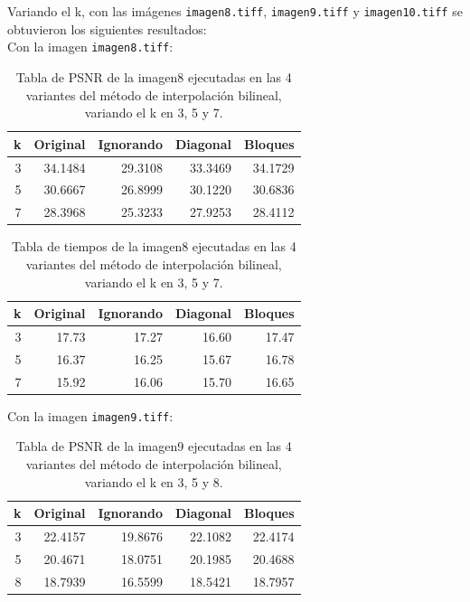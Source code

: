 \documentclass[a4paper]{article}
\newcounter{col}
\begin{document}
Variando el k, con las im\'agenes \texttt{imagen8.tiff}, \texttt{imagen9.tiff} y \texttt{imagen10.tiff} se obtuvieron los siguientes resultados:\\
Con la imagen \texttt{imagen8.tiff}:\\
\begin{table}[H]
\centering
\begin{tabular}{|r|r|r|r|r|}
\hline
\multicolumn{1}{|c|}{k} & \multicolumn{1}{c|}{Original} & \multicolumn{1}{c|}{Ignorando} & \multicolumn{1}{c|}{Diagonal} & \multicolumn{1}{c|}{Bloques} \\ \hline
3 & 34.1484 & 29.3108 & 33.3469 & 34.1729 \\ \hline
5 & 30.6667 &  26.8999 & 30.1220 & 30.6836 \\ \hline
7 & 28.3968 &  25.3233 & 27.9253 &  28.4112 \\ \hline
\end{tabular}
\caption{Tabla de PSNR de la imagen8 ejecutadas en las 4 variantes del m\'etodo de interpolaci\'on bilineal, variando el k en 3, 5 y 7.}
\label{}
\end{table}
\begin{table}[H]
\centering
\begin{tabular}{|r|r|r|r|r|}
\hline
\multicolumn{1}{|c|}{k} & \multicolumn{1}{c|}{Original} & \multicolumn{1}{c|}{Ignorando} & \multicolumn{1}{c|}{Diagonal} & \multicolumn{1}{c|}{Bloques} \\ \hline
3 & 17.73 & 17.27 & 16.60 & 17.47 \\ \hline
5 & 16.37 &  16.25 & 15.67 & 16.78 \\ \hline
7 & 15.92 &  16.06 & 15.70 &  16.65 \\ \hline
\end{tabular}
\caption{Tabla de tiempos de la imagen8 ejecutadas en las 4 variantes del m\'etodo de interpolaci\'on bilineal, variando el k en 3, 5 y 7.}
\label{}
\end{table}
Con la imagen \texttt{imagen9.tiff}:\\
\begin{table}[H]
\centering
\begin{tabular}{|r|r|r|r|r|}
\hline
\multicolumn{1}{|c|}{k} & \multicolumn{1}{c|}{Original} & \multicolumn{1}{c|}{Ignorando} & \multicolumn{1}{c|}{Diagonal} & \multicolumn{1}{c|}{Bloques} \\ \hline
3 & 22.4157 & 19.8676 & 22.1082 & 22.4174 \\ \hline
5 & 20.4671 & 18.0751 & 20.1985 &  20.4688 \\ \hline
8 &  18.7939 &  16.5599 & 18.5421 & 18.7957 \\ \hline
\end{tabular}
\caption{Tabla de PSNR de la imagen9 ejecutadas en las 4 variantes del m\'etodo de interpolaci\'on bilineal, variando el k en 3, 5 y 8.}
\label{}
\end{table}
\end{document}
